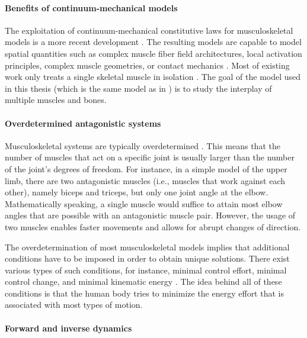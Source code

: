 \paragraph{Benefits of continuum-mechanical models}

The exploitation of continuum-mechani\-cal constitutive laws
for musculoskeletal models is a more recent development \cite{Roehrle16Two}.
The resulting models are capable to model spatial quantities
such as complex muscle fiber field architectures,
local activation principles, complex muscle geometries, or contact mechanics
.
Most of existing work only treats a single skeletal muscle in isolation
.
The goal of the model used in this thesis
(which is the same model as in
)
is to study the interplay of multiple muscles and bones.

\paragraph{Overdetermined antagonistic systems}

Musculoskeletal systems are typically overdetermined \cite{Roehrle16Two}.
This means that the number of muscles that act on a specific joint
is usually larger than the number of the joint's degrees of freedom.
For instance, in a simple model of the upper limb,
there are two antagonistic muscles
(i.e., muscles that work against each other), namely biceps and triceps,
but only one joint angle at the elbow.
Mathematically speaking, a single muscle would suffice to attain
most elbow angles that are possible with an antagonistic muscle pair.
However, the usage of two muscles enables faster movements and
allows for abrupt changes of direction.

The overdetermination of most musculoskeletal models
implies that additional conditions have to be imposed in order
to obtain unique solutions.
There exist various types of such conditions,
for instance, minimal control effort, minimal control change, and
minimal kinematic energy \cite{Valentin18Gradient}.
The idea behind all of these conditions is that the human body
tries to minimize the energy effort that is associated with
most types of motion.

\paragraph{Forward and inverse dynamics}

